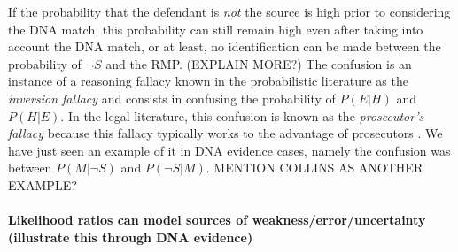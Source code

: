 \documentclass[10pt]{article}
\begin{document}
If the probability that the defendant is \textit{not} the source is high prior 
to considering the DNA match, this probability can still remain  
high even after taking into account the DNA match, or at least, 
no identification can be made between the probability 
of $\neg S$ and the RMP. (EXPLAIN MORE?) 
The confusion is an instance of a reasoning fallacy known in the probabilistic 
literature as the \textit{inversion fallacy} and consists in confusing the probability of
$P(E|H)$ and $P(H|E)$. In the legal literature, this confusion is known as the \textit{prosecutor's fallacy} because this fallacy typically works to 
the advantage of prosecutors \citep{Thompson1987Interpretation}.  We have just seen an example of it in DNA evidence cases, 
namely the confusion was between $P(M| \neg S)$ and $P(\neg S| M)$. MENTION COLLINS AS ANOTHER EXAMPLE?

\begin{comment}


\end{comment}


\paragraph{Likelihood ratios can model sources of weakness/error/uncertainty (illustrate this through DNA evidence)}
\end{document}
